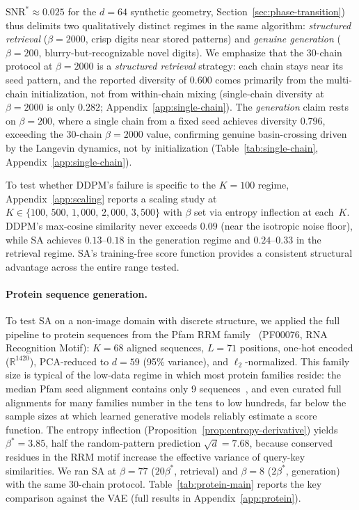 $\mathrm{SNR}^{*}\approx 0.025$ for the $d{=}64$ synthetic geometry, Section~\ref{sec:phase-transition}) thus delimits two qualitatively distinct regimes in the same algorithm: \emph{structured retrieval} ($\beta{=}2000$, crisp digits near stored patterns) and \emph{genuine generation} ($\beta{=}200$, blurry-but-recognizable novel digits). We emphasize that the 30-chain protocol at $\beta{=}2000$ is a \emph{structured retrieval} strategy: each chain stays near its seed pattern, and the reported diversity of $0.600$ comes primarily from the multi-chain initialization, not from within-chain mixing (single-chain diversity at $\beta{=}2000$ is only $0.282$; Appendix~\ref{app:single-chain}). The \emph{generation} claim rests on $\beta{=}200$, where a single chain from a fixed seed achieves diversity $0.796$, exceeding the 30-chain $\beta{=}2000$ value, confirming genuine basin-crossing driven by the Langevin dynamics, not by initialization (Table~\ref{tab:single-chain}, Appendix~\ref{app:single-chain}).

To test whether DDPM's failure is specific to the $K{=}100$ regime, Appendix~\ref{app:scaling} reports a scaling study at $K\in\{100,\,500,\,1{,}000,\,2{,}000,\,3{,}500\}$ with $\beta$ set via entropy inflection at each~$K$. DDPM's max-cosine similarity never exceeds $0.09$ (near the isotropic noise floor), while SA achieves $0.13$--$0.18$ in the generation regime and $0.24$--$0.33$ in the retrieval regime. SA's training-free score function provides a consistent structural advantage across the entire range tested.

\paragraph{Protein sequence generation.}
To test SA on a non-image domain with discrete structure, we applied the full pipeline to protein sequences from the Pfam RRM family~\cite{mistryPfamProteinFamilies2021} (PF00076, RNA Recognition Motif): $K{=}68$ aligned sequences, $L{=}71$ positions, one-hot encoded ($\mathbb{R}^{1420}$), PCA-reduced to $d{=}59$ (95\% variance), and $\ell_2$-normalized. This family size is typical of the low-data regime in which most protein families reside: the median Pfam seed alignment contains only 9 sequences~\cite{finnPfamProteinFamilies2008}, and even curated full alignments for many families number in the tens to low hundreds, far below the sample sizes at which learned generative models reliably estimate a score function. The entropy inflection (Proposition~\ref{prop:entropy-derivative}) yields $\beta^*{=}3.85$, half the random-pattern prediction $\sqrt{d}{=}7.68$, because conserved residues in the RRM motif increase the effective variance of query-key similarities. We ran SA at $\beta{=}77$ ($20\beta^*$, retrieval) and $\beta{=}8$ ($2\beta^*$, generation) with the same 30-chain protocol. Table~\ref{tab:protein-main} reports the key comparison against the VAE (full results in Appendix~\ref{app:protein}).


